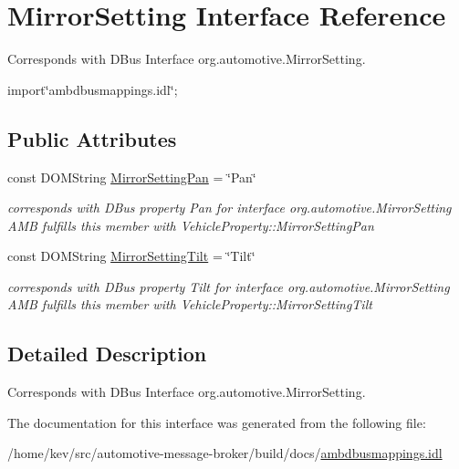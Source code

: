 \hypertarget{interfaceMirrorSetting}{\section{Mirror\+Setting Interface Reference}
\label{interfaceMirrorSetting}
}


Corresponds with D\+Bus Interface org.\+automotive.\+Mirror\+Setting.  




{\ttfamily import\char`\"{}ambdbusmappings.\+idl\char`\"{};}

\subsection*{Public Attributes}
\begin{DoxyCompactItemize}
\item 
\hypertarget{interfaceMirrorSetting_a428d469aa891fe44d296c08f6410d413}{const D\+O\+M\+String \hyperlink{interfaceMirrorSetting_a428d469aa891fe44d296c08f6410d413}{Mirror\+Setting\+Pan} = \char`\"{}Pan\char`\"{}}\label{interfaceMirrorSetting_a428d469aa891fe44d296c08f6410d413}

\begin{DoxyCompactList}\small\item\em corresponds with D\+Bus property Pan for interface org.\+automotive.\+Mirror\+Setting A\+M\+B fulfills this member with Vehicle\+Property\+::\+Mirror\+Setting\+Pan \end{DoxyCompactList}\item 
\hypertarget{interfaceMirrorSetting_aab9f06a28fc564ada030e60a8ed51b1d}{const D\+O\+M\+String \hyperlink{interfaceMirrorSetting_aab9f06a28fc564ada030e60a8ed51b1d}{Mirror\+Setting\+Tilt} = \char`\"{}Tilt\char`\"{}}\label{interfaceMirrorSetting_aab9f06a28fc564ada030e60a8ed51b1d}

\begin{DoxyCompactList}\small\item\em corresponds with D\+Bus property Tilt for interface org.\+automotive.\+Mirror\+Setting A\+M\+B fulfills this member with Vehicle\+Property\+::\+Mirror\+Setting\+Tilt \end{DoxyCompactList}\end{DoxyCompactItemize}


\subsection{Detailed Description}
Corresponds with D\+Bus Interface org.\+automotive.\+Mirror\+Setting. 

The documentation for this interface was generated from the following file\+:\begin{DoxyCompactItemize}
\item 
/home/kev/src/automotive-\/message-\/broker/build/docs/\hyperlink{ambdbusmappings_8idl}{ambdbusmappings.\+idl}\end{DoxyCompactItemize}
